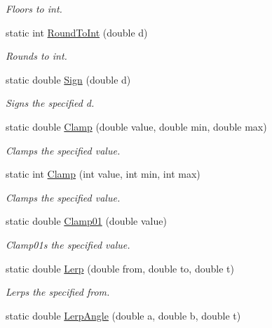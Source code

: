 \begin{DoxyCompactItemize}
\begin{DoxyCompactList}\small\item\em Floors to int. \end{DoxyCompactList}\item 
static int \hyperlink{struct_unity_engine_1_1_mathd_a7cb52a5ced742e497b0d8975ab872dac}{Round\+To\+Int} (double d)
\begin{DoxyCompactList}\small\item\em Rounds to int. \end{DoxyCompactList}\item 
static double \hyperlink{struct_unity_engine_1_1_mathd_a51a1213a287353b368fb7ce9dcad9568}{Sign} (double d)
\begin{DoxyCompactList}\small\item\em Signs the specified d. \end{DoxyCompactList}\item 
static double \hyperlink{struct_unity_engine_1_1_mathd_a209be08d7d0f1f474d6db6f3c26e2b24}{Clamp} (double value, double min, double max)
\begin{DoxyCompactList}\small\item\em Clamps the specified value. \end{DoxyCompactList}\item 
static int \hyperlink{struct_unity_engine_1_1_mathd_a112f1ae569d72e287488bbaf36103d65}{Clamp} (int value, int min, int max)
\begin{DoxyCompactList}\small\item\em Clamps the specified value. \end{DoxyCompactList}\item 
static double \hyperlink{struct_unity_engine_1_1_mathd_a942ae367d7d5de3848d48f4ef98820e3}{Clamp01} (double value)
\begin{DoxyCompactList}\small\item\em Clamp01s the specified value. \end{DoxyCompactList}\item 
static double \hyperlink{struct_unity_engine_1_1_mathd_a1b3043d20c25943083e91a9c70c1b7fb}{Lerp} (double from, double to, double t)
\begin{DoxyCompactList}\small\item\em Lerps the specified from. \end{DoxyCompactList}\item 
static double \hyperlink{struct_unity_engine_1_1_mathd_a7fab2c65894481c229af507445cacf63}{Lerp\+Angle} (double a, double b, double t)

\end{DoxyCompactItemize}
